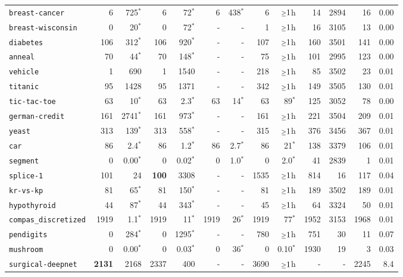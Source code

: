 \begin{tabular}{lrrrrrrrrrrrr}
\texttt{breast-cancer} & 6 & 725$^*$ & 6 & 72$^*$ & 6 & 438$^*$ & 6 & $\mathsmaller{\geq}1$h & 14 & 2894 & 16 & 0.00\\
\texttt{breast-wisconsin} & 0 & 20$^*$ & 0 & 72$^*$ & - & - & 1 & $\mathsmaller{\geq}1$h & 16 & 3105 & 13 & 0.00\\
\texttt{diabetes} & 106 & 312$^*$ & 106 & 920$^*$ & - & - & 107 & $\mathsmaller{\geq}1$h & 160 & 3501 & 141 & 0.00\\
\texttt{anneal} & 70 & 44$^*$ & 70 & 148$^*$ & - & - & 75 & $\mathsmaller{\geq}1$h & 101 & 2995 & 123 & 0.00\\
\texttt{vehicle} & 1 & 690 & 1 & 1540 & - & - & 218 & $\mathsmaller{\geq}1$h & 85 & 3502 & 23 & 0.01\\
\texttt{titanic} & 95 & 1428 & 95 & 1371 & - & - & 342 & $\mathsmaller{\geq}1$h & 149 & 3505 & 130 & 0.01\\
\texttt{tic-tac-toe} & 63 & 10$^*$ & 63 & 2.3$^*$ & 63 & 14$^*$ & 63 & 89$^*$ & 125 & 3052 & 78 & 0.00\\
\texttt{german-credit} & 161 & 2741$^*$ & 161 & 973$^*$ & - & - & 161 & $\mathsmaller{\geq}1$h & 221 & 3504 & 209 & 0.01\\
\texttt{yeast} & 313 & 139$^*$ & 313 & 558$^*$ & - & - & 315 & $\mathsmaller{\geq}1$h & 376 & 3456 & 367 & 0.01\\
\texttt{car} & 86 & 2.4$^*$ & 86 & 1.2$^*$ & 86 & 2.7$^*$ & 86 & 21$^*$ & 138 & 3379 & 106 & 0.01\\
\texttt{segment} & 0 & 0.00$^*$ & 0 & 0.02$^*$ & 0 & 1.0$^*$ & 0 & 2.0$^*$ & 41 & 2839 & 1 & 0.01\\
\texttt{splice-1} & 101 & 24 & \textbf{100} & 3308 & - & - & 1535 & $\mathsmaller{\geq}1$h & 814 & 16 & 117 & 0.04\\
\texttt{kr-vs-kp} & 81 & 65$^*$ & 81 & 150$^*$ & - & - & 81 & $\mathsmaller{\geq}1$h & 189 & 3502 & 189 & 0.01\\
\texttt{hypothyroid} & 44 & 87$^*$ & 44 & 343$^*$ & - & - & 45 & $\mathsmaller{\geq}1$h & 64 & 3324 & 50 & 0.01\\
\texttt{compas\_discretized} & 1919 & 1.1$^*$ & 1919 & 11$^*$ & 1919 & 26$^*$ & 1919 & 77$^*$ & 1952 & 3153 & 1968 & 0.01\\
\texttt{pendigits} & 0 & 284$^*$ & 0 & 1295$^*$ & - & - & 780 & $\mathsmaller{\geq}1$h & 751 & 30 & 11 & 0.07\\
\texttt{mushroom} & 0 & 0.00$^*$ & 0 & 0.03$^*$ & 0 & 36$^*$ & 0 & 0.10$^*$ & 1930 & 19 & 3 & 0.03\\
\texttt{surgical-deepnet} & \textbf{2131} & 2168 & 2337 & 400 & - & - & 3690 & $\mathsmaller{\geq}1$h & - & - & 2245 & 8.4\\

\end{tabular}
